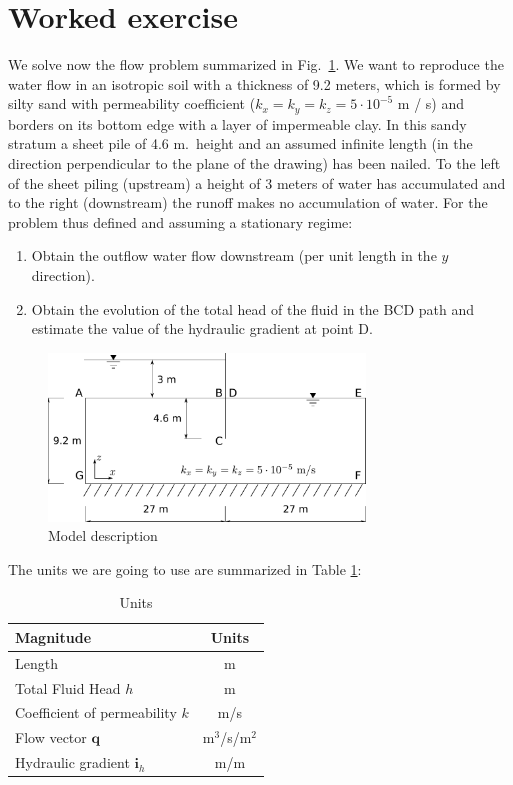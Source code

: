 \section{Worked exercise}

We solve now the flow problem summarized in Fig.~\ref{enu01}. We want
to reproduce the water flow in an isotropic soil with a thickness of
9.2 meters, which is formed by silty sand with permeability
coefficient ($k_x=k_y=k_z=5\cdot 10^{-5}$ m / s) and borders on its
bottom edge with a layer of impermeable clay. In this sandy stratum a
sheet pile of 4.6 m.~height and an assumed infinite length (in the
direction perpendicular to the plane of the drawing) has been
nailed. To the left of the sheet piling (upstream) a height of 3
meters of water has accumulated and to the right (downstream) the
runoff makes no accumulation of water. For the problem thus defined
and assuming a stationary regime:
\begin{enumerate}
\item Obtain the outflow water flow downstream (per unit length in the
  $y$ direction).
\item Obtain the evolution of the total head of the fluid
  in the BCD path and estimate the value of the hydraulic gradient at
  point D.
\end{enumerate}

\begin{figure}[!h]
  \begin{center}
    \includegraphics[width=0.75\textwidth]{./body/images/enu01}
  \end{center}
  \caption{Model description}
  \label{enu01}
\end{figure}

The units we are going to use are summarized in Table \ref{tab:201}:
\begin{table}[!h]
  \centering
  \begin{tabular}{lc}
    \hline
    Magnitude&Units\\
    \hline
    Length & m\\
    Total Fluid Head $h$ & m \\
    Coefficient of permeability $k$ & m/s\\
    Flow vector $\mathbf{q}$ & m$^3$/s/m$^2$ \\
    Hydraulic gradient $\mathbf{i}_h$ & m/m \\
    \hline
  \end{tabular}
  \caption{Units}
  \label{tab:201}
\end{table}

